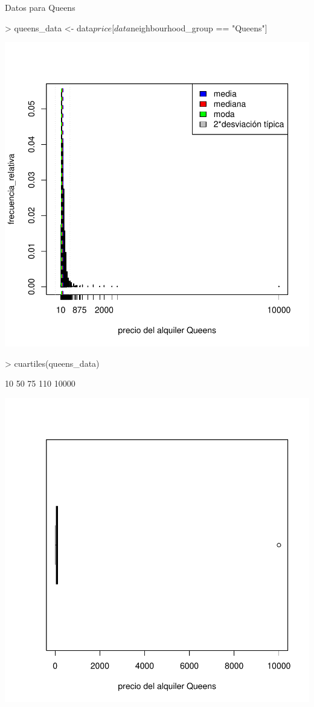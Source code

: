 \documentclass [a4paper] {article}
\begin{document}
Datos para Queens
\begin{Schunk}
\begin{Sinput}
> queens_data <- data$price[data$neighbourhood_group == "Queens"]
\end{Sinput}
\end{Schunk}
\begin{center}
\includegraphics{entrega-queens_data_plot}
\begin{Schunk}
\begin{Sinput}
> cuartiles(queens_data)
\end{Sinput}
\begin{Soutput}
[1]    10    50    75   110 10000
\end{Soutput}
\end{Schunk}
\includegraphics{entrega-queens_data_plot_c}
\end{center}
\end{document}
